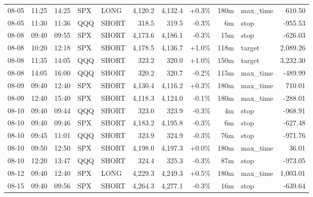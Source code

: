 \documentclass[11pt,a4paper,twoside]{article}
\begin{document}
\begin{center}
\begin{longtable}{>{\color{txtmain}}l l l l l r r r r >{\color{txtmain}}l r}
08-05 & 11:25 & 14:25 & SPX & LONG & 4,120.2 & 4,132.4 & \textcolor{wingreen}{+0.3\%} & 180m & max\_time & \textcolor{wingreen}{610.50} \\
08-05 & 11:30 & 11:36 & QQQ & SHORT & 318.5 & 319.5 & \textcolor{lossred}{-0.3\%} & 6m & stop & \textcolor{lossred}{-955.53} \\
08-08 & 09:40 & 09:55 & SPX & SHORT & 4,173.6 & 4,186.1 & \textcolor{lossred}{-0.3\%} & 15m & stop & \textcolor{lossred}{-626.03} \\
08-08 & 10:20 & 12:18 & SPX & SHORT & 4,178.5 & 4,136.7 & \textcolor{wingreen}{+1.0\%} & 118m & target & \textcolor{wingreen}{2,089.26} \\
08-08 & 11:35 & 14:05 & QQQ & SHORT & 323.2 & 320.0 & \textcolor{wingreen}{+1.0\%} & 150m & target & \textcolor{wingreen}{3,232.30} \\
08-08 & 14:05 & 16:00 & QQQ & SHORT & 320.2 & 320.7 & \textcolor{lossred}{-0.2\%} & 115m & max\_time & \textcolor{lossred}{-489.99} \\
08-09 & 09:40 & 12:40 & SPX & SHORT & 4,130.4 & 4,116.2 & \textcolor{wingreen}{+0.3\%} & 180m & max\_time & \textcolor{wingreen}{710.01} \\
08-09 & 12:40 & 15:40 & SPX & SHORT & 4,118.3 & 4,124.0 & \textcolor{lossred}{-0.1\%} & 180m & max\_time & \textcolor{lossred}{-288.01} \\
08-10 & 09:40 & 09:44 & QQQ & SHORT & 323.0 & 323.9 & \textcolor{lossred}{-0.3\%} & 4m & stop & \textcolor{lossred}{-968.91} \\
08-10 & 09:40 & 09:46 & SPX & SHORT & 4,183.2 & 4,195.8 & \textcolor{lossred}{-0.3\%} & 6m & stop & \textcolor{lossred}{-627.48} \\
08-10 & 09:45 & 11:01 & QQQ & SHORT & 323.9 & 324.9 & \textcolor{lossred}{-0.3\%} & 76m & stop & \textcolor{lossred}{-971.76} \\
08-10 & 09:50 & 12:50 & SPX & SHORT & 4,198.0 & 4,197.3 & \textcolor{wingreen}{+0.0\%} & 180m & max\_time & \textcolor{wingreen}{36.01} \\
08-10 & 12:20 & 13:47 & QQQ & SHORT & 324.4 & 325.3 & \textcolor{lossred}{-0.3\%} & 87m & stop & \textcolor{lossred}{-973.05} \\
08-12 & 09:40 & 12:40 & SPX & LONG & 4,229.3 & 4,249.3 & \textcolor{wingreen}{+0.5\%} & 180m & max\_time & \textcolor{wingreen}{1,003.01} \\
08-15 & 09:40 & 09:56 & SPX & SHORT & 4,264.3 & 4,277.1 & \textcolor{lossred}{-0.3\%} & 16m & stop & \textcolor{lossred}{-639.64} \\

\end{longtable}
\end{center}
\end{document}
